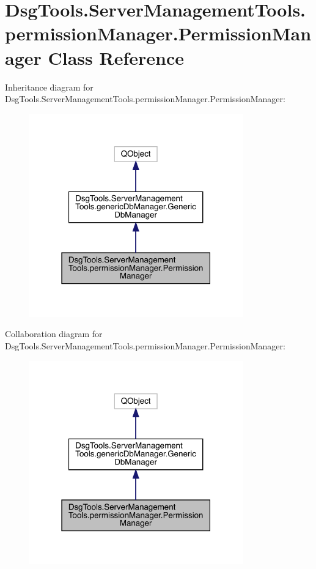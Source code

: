 \hypertarget{class_dsg_tools_1_1_server_management_tools_1_1permission_manager_1_1_permission_manager}{}\section{Dsg\+Tools.\+Server\+Management\+Tools.\+permission\+Manager.\+Permission\+Manager Class Reference}
\label{class_dsg_tools_1_1_server_management_tools_1_1permission_manager_1_1_permission_manager}


Inheritance diagram for Dsg\+Tools.\+Server\+Management\+Tools.\+permission\+Manager.\+Permission\+Manager\+:
\nopagebreak
\begin{figure}[H]
\begin{center}
\leavevmode
\includegraphics[width=262pt]{class_dsg_tools_1_1_server_management_tools_1_1permission_manager_1_1_permission_manager__inherit__graph}
\end{center}
\end{figure}


Collaboration diagram for Dsg\+Tools.\+Server\+Management\+Tools.\+permission\+Manager.\+Permission\+Manager\+:
\nopagebreak
\begin{figure}[H]
\begin{center}
\leavevmode
\includegraphics[width=262pt]{class_dsg_tools_1_1_server_management_tools_1_1permission_manager_1_1_permission_manager__coll__graph}
\end{center}
\end{figure}
